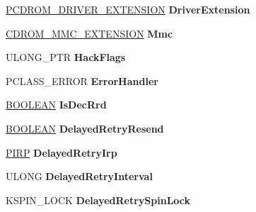 \begin{DoxyCompactItemize}
\hyperlink{struct___c_d_r_o_m___d_r_i_v_e_r___e_x_t_e_n_s_i_o_n}{P\+C\+D\+R\+O\+M\+\_\+\+D\+R\+I\+V\+E\+R\+\_\+\+E\+X\+T\+E\+N\+S\+I\+ON} {\bfseries Driver\+Extension}
\item 
\mbox{\label{struct___c_d_r_o_m___d_a_t_a_a1a3f6dc6f44b7eb472aab6744d64978c}} 
\hyperlink{struct___c_d_r_o_m___m_m_c___e_x_t_e_n_s_i_o_n}{C\+D\+R\+O\+M\+\_\+\+M\+M\+C\+\_\+\+E\+X\+T\+E\+N\+S\+I\+ON} {\bfseries Mmc}
\item 
\mbox{\label{struct___c_d_r_o_m___d_a_t_a_a0005d1d345db0547085894cd5eef6d39}} 
U\+L\+O\+N\+G\+\_\+\+P\+TR {\bfseries Hack\+Flags}
\item 
\mbox{\label{struct___c_d_r_o_m___d_a_t_a_a76258911408bc1e0d623871d6ea2527f}} 
P\+C\+L\+A\+S\+S\+\_\+\+E\+R\+R\+OR {\bfseries Error\+Handler}
\item 
\mbox{\label{struct___c_d_r_o_m___d_a_t_a_af7ab4172b815757c71aacc3d1e64b003}} 
\hyperlink{_processor_bind_8h_a112e3146cb38b6ee95e64d85842e380a}{B\+O\+O\+L\+E\+AN} {\bfseries Is\+Dec\+Rrd}
\item 
\mbox{\label{struct___c_d_r_o_m___d_a_t_a_a8c0644d1bee3f2159aadf0ac14d0a168}} 
\hyperlink{_processor_bind_8h_a112e3146cb38b6ee95e64d85842e380a}{B\+O\+O\+L\+E\+AN} {\bfseries Delayed\+Retry\+Resend}
\item 
\mbox{\label{struct___c_d_r_o_m___d_a_t_a_a9ccc2f0a31f93c85711dacce3babb548}} 
\hyperlink{interfacevoid}{P\+I\+RP} {\bfseries Delayed\+Retry\+Irp}
\item 
\mbox{\label{struct___c_d_r_o_m___d_a_t_a_a5de506ac18fd0d83ccea3148c76bf03f}} 
U\+L\+O\+NG {\bfseries Delayed\+Retry\+Interval}
\item 
\mbox{\label{struct___c_d_r_o_m___d_a_t_a_a6e40ac13b7c0f0ee67b2754c2ea80c8a}} 
K\+S\+P\+I\+N\+\_\+\+L\+O\+CK {\bfseries Delayed\+Retry\+Spin\+Lock}
\item 
\mbox{\label{struct___c_d_r_o_m___d_a_t_a_a8a5c219f47d6f7cfcaac69c250c8bc57}} 

\end{DoxyCompactItemize}
